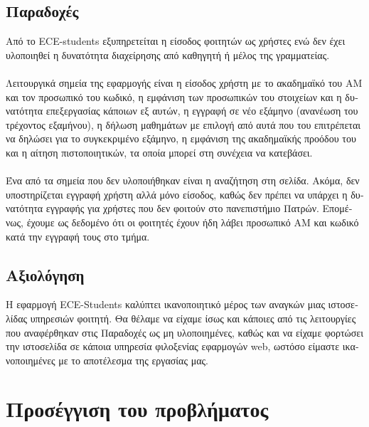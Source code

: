 \documentclass[manuscript,screen,review]{acmart}
\newcommand{\gr}[1]{\foreignlanguage{greek}{#1}}
\begin{document}
\subsection{\gr{Παραδοχές}}
\gr{Από το} ECE-students \gr{εξυπηρετείται η είσοδος φοιτητών ως χρήστες ενώ δεν έχει υλοποιηθεί η δυνατότητα διαχείρησης από καθηγητή ή μέλος της γραμματείας.}
\\
\\\gr{Λειτουργικά σημεία της εφαρμογής είναι η είσοδος χρήστη με το ακαδημαϊκό του ΑΜ και τον προσωπικό του κωδικό, η εμφάνιση των προσωπικών του στοιχείων και η δυνατότητα επεξεργασίας κάποιων εξ αυτών, η εγγραφή σε νέο εξάμηνο (ανανέωση του τρέχοντος εξαμήνου), η δήλωση μαθημάτων με επιλογή από αυτά που του επιτρέπεται να δηλώσει για το συγκεκριμένο εξάμηνο, η εμφάνιση της ακαδημαϊκής προόδου του και η αίτηση πιστοποιητικών, τα οποία μπορεί στη συνέχεια να κατεβάσει.}
\\
\\\gr{Ένα από τα σημεία που δεν υλοποιήθηκαν είναι η αναζήτηση στη σελίδα. Ακόμα, δεν υποστηρίζεται εγγραφή χρήστη αλλά μόνο είσοδος, καθώς δεν πρέπει να υπάρχει η δυνατότητα εγγραφής για χρήστες που δεν φοιτούν στο πανεπιστήμιο Πατρών. Επομένως, έχουμε ως δεδομένο ότι οι φοιτητές έχουν ήδη λάβει προσωπικό ΑΜ και κωδικό κατά την εγγραφή τους στο τμήμα.}

\subsection{\gr{Αξιολόγηση}}
\gr{Η εφαρμογή} ECE-Students \gr{καλύπτει ικανοποιητικό μέρος των αναγκών μιας ιστοσελίδας υπηρεσιών φοιτητή. Θα θέλαμε να είχαμε ίσως και κάποιες από τις λειτουργίες που αναφέρθηκαν στις Παραδοχές ως μη υλοποιημένες, καθώς και να είχαμε φορτώσει την ιστοσελίδα σε κάποια υπηρεσία φιλοξενίας εφαρμογών} web, \gr{ωστόσο είμαστε ικανοποιημένες με το αποτέλεσμα της εργασίας μας.}

\section{\gr{Προσέγγιση του προβλήματος}}
\end{document}
